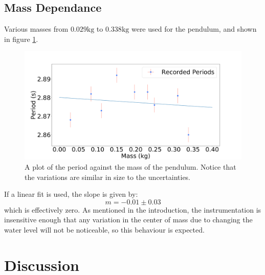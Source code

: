 \documentclass[%
 reprint,
 amsmath,amssymb
 aps,
]{revtex4-2}
\begin{document}
\subsection{Mass Dependance}
Various masses from $0.029\si{\kilogram}$ to $0.338\si{\kilogram}$ were used for the pendulum, and shown in figure \ref{fig:mass-simple}.
\begin{figure}[!h]
    \includegraphics[width=\linewidth]{Figures/mass_simple.png}

    \caption{A plot of the period against the mass of the pendulum. Notice that the variations are similar in size to the uncertainties.}
    \label{fig:mass-simple}
\end{figure}
If a linear fit is used, the slope is given by:
\begin{equation}
    m = -0.01 \pm 0.03
    \label{eq:}
\end{equation}
which is effectively zero. As mentioned in the introduction, the instrumentation is insensitive enough that any variation in the center of mass due to changing the water level will not be noticeable, so this behaviour is expected.
\section{Discussion}
\end{document}

